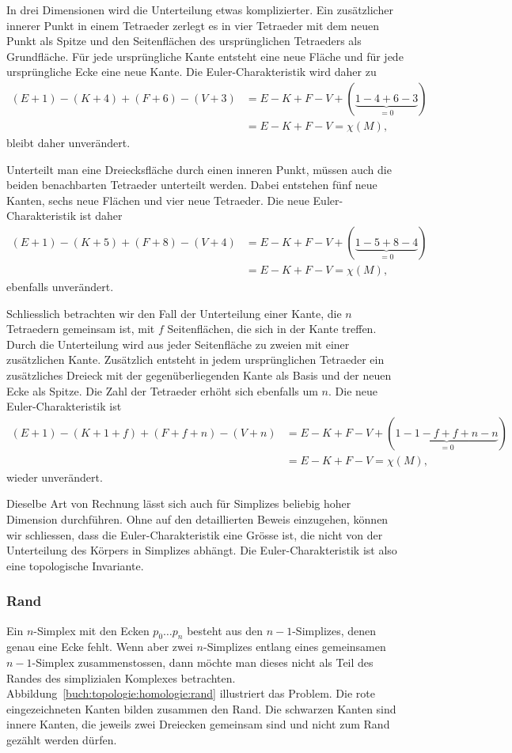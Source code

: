 In drei Dimensionen wird die Unterteilung etwas komplizierter.
Ein zusätzlicher innerer Punkt in einem Tetraeder zerlegt
es in vier Tetraeder mit dem neuen Punkt als Spitze und den
Seitenflächen des ursprünglichen Tetraeders als Grundfläche.
Für jede ursprüngliche Kante entsteht eine neue Fläche und
für jede ursprüngliche Ecke eine neue Kante.
Die Euler-Charakteristik wird daher zu
\begin{align*}
(E+1) - (K+4) + (F+6) - (V+3)
&=
E-K+F-V
+
(\underbrace{1-4+6-3}_{\displaystyle=0})
\\
&=
E-K+F-V
=
\chi(M),
\end{align*}
bleibt daher unverändert.

Unterteilt man eine Dreiecksfläche durch einen inneren Punkt,
müssen auch die beiden benachbarten Tetraeder unterteilt werden.
Dabei entstehen fünf neue Kanten, sechs neue Flächen und vier
neue Tetraeder.
Die neue Euler-Charakteristik ist daher
\begin{align*}
(E+1) - (K+5) + (F+8) - (V+4)
&=
E-K+F-V
+(\underbrace{1-5+8-4}_{\displaystyle=0})
\\
&=
E-K+F-V
=
\chi(M),
\end{align*}
ebenfalls unverändert.

Schliesslich betrachten wir den Fall der Unterteilung einer Kante,
die $n$ Tetraedern gemeinsam ist, mit $f$ Seitenflächen, die sich
in der Kante treffen.
Durch die Unterteilung wird aus jeder Seitenfläche zu zweien
mit einer zusätzlichen Kante.
Zusätzlich entsteht in jedem ursprünglichen Tetraeder ein zusätzliches
Dreieck mit der gegenüberliegenden Kante als Basis und der neuen
Ecke als Spitze.
Die Zahl der Tetraeder erhöht sich ebenfalls um $n$.
Die neue Euler-Charakteristik ist
\begin{align*}
(E+1)
-
(K+1+f)
+
(F+f+n)
-
(V+n)
&=
E-K+F-V + (\underbrace{1-1-f+f+n-n}_{\displaystyle=0})
\\
&=
E-K+F-V
=
\chi(M),
\end{align*}
wieder unverändert.

Dieselbe Art von Rechnung lässt sich auch für Simplizes beliebig hoher
Dimension durchführen.
Ohne auf den detaillierten Beweis einzugehen, können wir schliessen,
dass die Euler-Charakteristik eine Grösse ist, die nicht von der Unterteilung
des Körpers in Simplizes abhängt.
Die Euler-Charakteristik ist also eine topologische Invariante.

%
%
\subsubsection{Rand}
%
Ein $n$-Simplex mit den Ecken $p_0\dots p_n$ besteht aus den $n-1$-Simplizes,
denen genau eine Ecke fehlt.
Wenn aber zwei $n$-Simplizes entlang eines gemeinsamen $n-1$-Simplex
zusammenstossen, dann möchte man dieses nicht als Teil des Randes
des simplizialen Komplexes betrachten.
Abbildung~\ref{buch:topologie:homologie:rand} illustriert das Problem.
Die rote eingezeichneten Kanten bilden zusammen den Rand.
Die schwarzen Kanten sind innere Kanten, die jeweils zwei Dreiecken 
gemeinsam sind und nicht zum Rand gezählt werden dürfen.


